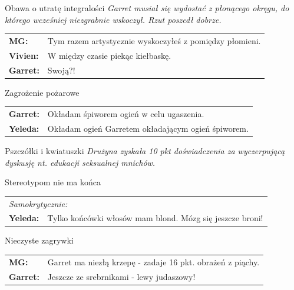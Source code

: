 \documentclass[10pt,twoside,twocolumn]{book}
\begin{document}
\begin{rpg-quotebox}{Obawa o utratę integralości}
   \textit{Garret musiał się wydostać z płonącego okręgu, do którego wcześniej niezgrabnie wskoczył. Rzut poszedł dobrze.}\\

   \begin{tabularx}{\columnwidth}{lX}
      \textbf{MG:} & Tym razem artystycznie wyskoczyłeś z pomiędzy płomieni.\\
      \textbf{Vivien:} & W między czasie piekąc kiełbaskę.\\
      \textbf{Garret:} & Swoją?!\\
   \end{tabularx}
\end{rpg-quotebox}

\begin{rpg-quotebox}{Zagrożenie pożarowe}
   \begin{tabularx}{\columnwidth}{lX}
      \textbf{Garret:} & Okładam śpiworem ogień w celu ugaszenia.\\
      \textbf{Yeleda:} & Okładam ogień Garretem okładającym ogień śpiworem.\\
   \end{tabularx}
\end{rpg-quotebox}

\begin{rpg-quotebox}{Pszczółki i kwiatuszki}
   \textit{Drużyna zyskała 10 pkt doświadczenia za wyczerpującą dyskusję nt. edukacji seksualnej mnichów.}
\end{rpg-quotebox}

\begin{rpg-quotebox}{Stereotypom nie ma końca}
   \begin{tabularx}{\columnwidth}{lX}
      \multicolumn{2}{l}{\textit{Samokrytycznie:}}\\
      \textbf{Yeleda:} & Tylko końcówki włosów mam blond. Mózg się jeszcze broni!\\
   \end{tabularx}
\end{rpg-quotebox}

\begin{rpg-quotebox}{Nieczyste zagrywki}
   \begin{tabularx}{\columnwidth}{lX}
      \textbf{MG:} & Garret ma niezłą krzepę - zadaje 16 pkt. obrażeń z piąchy.\\
      \textbf{Garret:} & Jeszcze ze srebrnikami - lewy judaszowy!\\
   \end{tabularx}
\end{rpg-quotebox}
\end{document}
